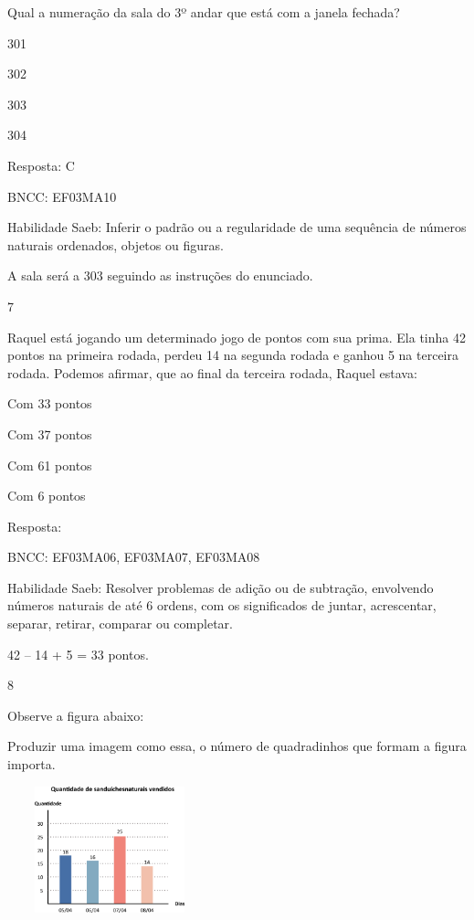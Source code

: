 \begin{escolha}
{\begin{escolha}
{Qual a numeração da sala do 3º andar que está com a janela fechada?

\begin{escolha}
\item
  301
\item
  302
\item
  303
\item
  304
\end{escolha}

Resposta: C

BNCC: EF03MA10

Habilidade Saeb: Inferir o padrão ou a regularidade de uma sequência de
números naturais ordenados, objetos ou figuras.

A sala será a 303 seguindo as instruções do enunciado.

\num{7}

Raquel está jogando um determinado jogo de pontos com sua prima. Ela
tinha 42 pontos na primeira rodada, perdeu 14 na segunda rodada e ganhou
5 na terceira rodada. Podemos afirmar, que ao final da terceira rodada,
Raquel estava:

\begin{escolha}
\item
  Com 33 pontos
\item
  Com 37 pontos
\item
  Com 61 pontos
\item
  Com 6 pontos
\end{escolha}

Resposta:

BNCC: EF03MA06, EF03MA07, EF03MA08

Habilidade Saeb: Resolver problemas de adição ou de subtração,
envolvendo números naturais de até 6 ordens, com os significados de
juntar, acrescentar, separar, retirar, comparar ou completar.

42 -- 14 + 5 = 33 pontos.

\num{8}

Observe a figura abaixo:

Produzir uma imagem como essa, o número de quadradinhos que formam a
figura importa.

\includegraphics[width=2.32692in,height=1.43990in]{media/image109.png}

}
\end{escolha}}
\end{escolha}
